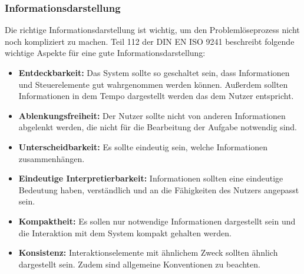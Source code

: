 \subsubsection*{Informationsdarstellung}
Die richtige Informationsdarstellung ist wichtig, um den Problemlöseprozess nicht noch kompliziert zu machen. Teil 112 der DIN EN ISO 9241 beschreibt folgende wichtige Aspekte für eine gute Informationsdarstellung:
\begin{itemize}
\item \textbf{Entdeckbarkeit:} Das System sollte so geschaltet sein, dass Informationen und Steuerelemente gut wahrgenommen werden können. Außerdem sollten Informationen in dem Tempo dargestellt werden das dem Nutzer entspricht.
\item \textbf{Ablenkungsfreiheit:} Der Nutzer sollte nicht von anderen Informationen abgelenkt werden, die nicht für die Bearbeitung der Aufgabe notwendig sind.
\item \textbf{Unterscheidbarkeit:} Es sollte eindeutig sein, welche Informationen zusammenhängen.
\item \textbf{Eindeutige Interpretierbarkeit:} Informationen sollten eine eindeutige Bedeutung haben, verständlich und an die Fähigkeiten des Nutzers angepasst sein.
\item \textbf{Kompaktheit:} Es sollen nur notwendige Informationen dargestellt sein und die Interaktion mit dem System kompakt gehalten werden.
\item \textbf{Konsistenz:} Interaktionselemente mit ähnlichem Zweck sollten ähnlich dargestellt sein. Zudem sind allgemeine Konventionen zu beachten.
\end{itemize}


